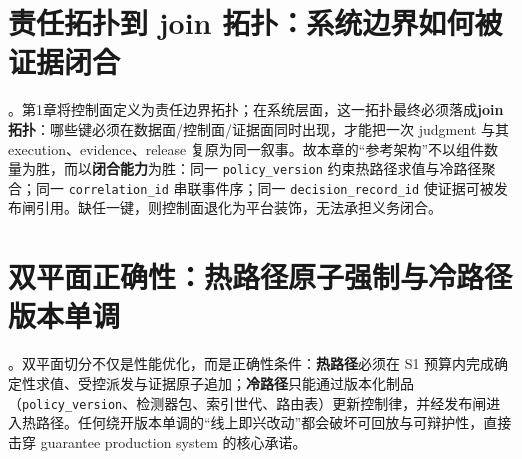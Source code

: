 \documentclass[11pt,a4paper]{report}
\begin{document}



\section{责任拓扑到 join 拓扑：系统边界如何被证据闭合}
\ControlPlane{}。第1章将控制面定义为责任边界拓扑；在系统层面，这一拓扑最终必须落成\textbf{join 拓扑}：哪些键必须在数据面/控制面/证据面同时出现，才能把一次 judgment 与其 execution、evidence、release 复原为同一叙事。故本章的“参考架构”不以组件数量为胜，而以\textbf{闭合能力}为胜：同一 \texttt{policy\_version} 约束热路径求值与冷路径聚合；同一 \texttt{correlation\_id} 串联事件序；同一 \texttt{decision\_record\_id} 使证据可被发布闸引用。缺任一键，则控制面退化为平台装饰，无法承担义务闭合。

\section{双平面正确性：热路径原子强制与冷路径版本单调}
\ControlPlane{}。双平面切分不仅是性能优化，而是正确性条件：\textbf{热路径}必须在 S1 预算内完成确定性求值、受控派发与证据原子追加；\textbf{冷路径}只能通过版本化制品（\texttt{policy\_version}、检测器包、索引世代、路由表）更新控制律，并经发布闸进入热路径。任何绕开版本单调的“线上即兴改动”都会破坏可回放与可辩护性，直接击穿 guarantee production system 的核心承诺。
\end{document}
